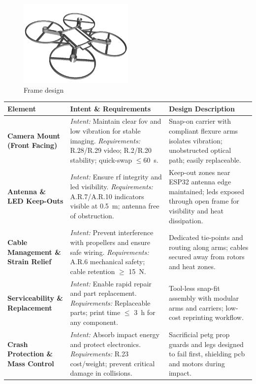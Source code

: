 \begin{figure}[H]
    \centering
    \captionsetup{justification=centering, margin=1cm}
    \includegraphics[width=0.5\textwidth]{img/main-frame.PNG}
    \caption{Frame design}
    \label{fig:frame}
\end{figure}

\begin{longtable}{@{}p{3.2cm} p{6.4cm} p{6.4cm}@{}}
\toprule
\textbf{Element} & \textbf{Intent \& Requirements} & \textbf{Design Description} \\ 
\midrule

\textbf{Camera Mount (Front Facing)} &
\textit{Intent:} Maintain clear \gls{fov} and low vibration for stable imaging. \newline
\textit{Requirements:} R.28/R.29 video; R.2/R.20 stability; quick-swap $\leq 60$~s. &
Snap-on carrier with compliant flexure arms isolates vibration; unobstructed optical path; easily replaceable. \\ 
\midrule

\textbf{Antenna \& LED Keep-Outs} &
\textit{Intent:} Ensure \gls{rf} integrity and \gls{led} visibility. \newline
\textit{Requirements:} A.R.7/A.R.10 indicators visible at 0.5~m; antenna free of obstruction. &
Keep-out zones near ESP32 antenna edge maintained; \glspl{led} exposed through open frame for visibility and heat dissipation. \\ 
\midrule

\textbf{Cable Management \& Strain Relief} &
\textit{Intent:} Prevent interference with propellers and ensure safe wiring. \newline
\textit{Requirements:} A.R.6 mechanical safety; cable retention $\geq$ 15~N. &
Dedicated tie-points and routing along arms; cables secured away from rotors and heat zones. \\ 
\midrule

\textbf{Serviceability \& Replacement} &
\textit{Intent:} Enable rapid repair and part replacement. \newline
\textit{Requirements:} Replaceable parts; print time $\leq$ 3~h for any component. &
Tool-less snap-fit assembly with modular arms and carriers; low-cost reprinting workflow. \\ 
\midrule

\textbf{Crash Protection \& Mass Control} &
\textit{Intent:} Absorb impact energy and protect electronics. \newline
\textit{Requirements:} R.23 cost/weight; prevent critical damage in collisions. &
Sacrificial \gls{petg} prop guards and legs designed to fail first, shielding \gls{pcb} and motors during impact. \\ 
\bottomrule
\end{longtable}